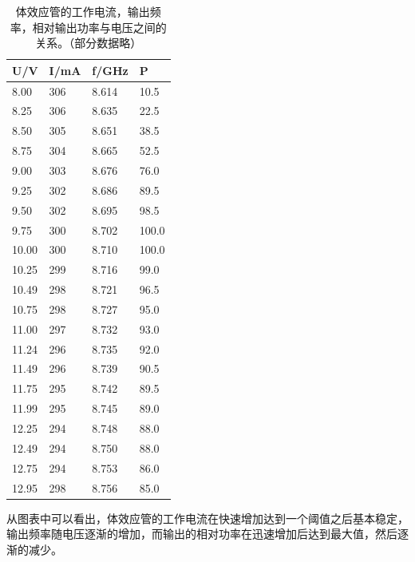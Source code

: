 \documentclass[aps,pre,12pt,preprint,onecolumn,showpacs,showkeys,UTF8]{revtex4-1}
\begin{document}
\begin{table}[ht]
	\centering
	\begin{tabular}{m{3cm}<{\centering}m{3cm}<{\centering}m{3cm}<{\centering}m{3cm}<{\centering}}
		\hline
		\hline
		U/V	&	I/mA	&	f/GHz	&	P	\\
		\hline
8.00	&	306	&	8.614	&	10.5	\\
8.25	&	306	&	8.635	&	22.5	\\
8.50	&	305	&	8.651	&	38.5	\\
8.75	&	304	&	8.665	&	52.5	\\
9.00	&	303	&	8.676	&	76.0	\\
9.25	&	302	&	8.686	&	89.5	\\
9.50	&	302	&	8.695	&	98.5	\\
9.75	&	300	&	8.702	&	100.0	\\
10.00	&	300	&	8.710	&	100.0	\\
10.25	&	299	&	8.716	&	99.0	\\
10.49	&	298	&	8.721	&	96.5	\\
10.75	&	298	&	8.727	&	95.0	\\
11.00	&	297	&	8.732	&	93.0	\\
11.24	&	296	&	8.735	&	92.0	\\
11.49	&	296	&	8.739	&	90.5	\\
11.75	&	295	&	8.742	&	89.5	\\
11.99	&	295	&	8.745	&	89.0	\\
12.25	&	294	&	8.748	&	88.0	\\
12.49	&	294	&	8.750	&	88.0	\\
12.75	&	294	&	8.753	&	86.0	\\
12.95	&	298	&	8.756	&	85.0	\\
		\hline
	\end{tabular}
	\caption{体效应管的工作电流，输出频率，相对输出功率与电压之间的关系。（部分数据略）}
	\label{tab:table1}
\end{table}

从图表中可以看出，体效应管的工作电流在快速增加达到一个阈值之后基本稳定，输出频率随电压逐渐的增加，而输出的相对功率在迅速增加后达到最大值，然后逐渐的减少。
\end{document}
